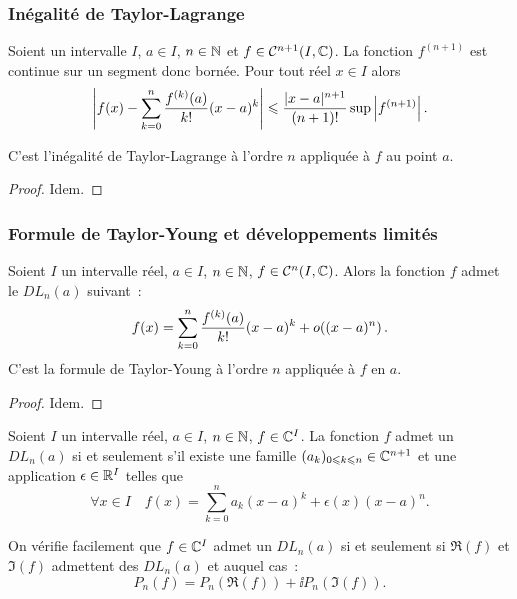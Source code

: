 \subsubsection{Inégalité de Taylor-Lagrange}

\begin{theo}
  Soient un intervalle \(I\), \(a \in I\), \(n \in \mathbb{N}\) et \(f \in
  \mathcal{C}^{{n+1}} (I,\mathbb{C})\). La fonction \(f^{(n+1)}\) est continue sur un segment
  donc bornée. Pour tout réel \(x \in I\) alors
  \begin{equation}
    \left|f(x)-\sum_{k = 0}^n \frac{f^{(k)}(a)}{k!}(x-a)^k\right| \leqslant
    \frac{|x-a|^{n+1}}{(n+1)!} \sup \left\lvert f^{(n+1)}\right\rvert.
  \end{equation}

  C'est l'inégalité de Taylor-Lagrange à l'ordre \(n\) appliquée à \(f\) au
  point \(a\).
\end{theo}
\begin{proof}
  Idem.
\end{proof}

\subsubsection{Formule de Taylor-Young et développements limités}

\begin{theo}
  Soient \(I\) un intervalle réel, \(a \in I\), \(n \in \mathbb{N}\), \(f \in
  \mathcal{C}^{n}(I,\mathbb{C})\). Alors la fonction \(f\) admet le \(DL_n(a)\) suivant~:
  \begin{equation}
    f(x) = \sum_{k = 0}^n \frac{f^{(k)}(a)}{k!} (x-a)^k + o\mathopen{}\left((x-a)^n\right).
  \end{equation}
  C'est la formule de Taylor-Young à l'ordre \(n\) appliquée à \(f\) en \(a\).
\end{theo}
\begin{proof}
  Idem.
\end{proof}

\begin{defdef}
  Soient \(I\) un intervalle réel, \(a \in I\), \(n \in \mathbb{N}\), \(f \in \mathbb{C}^I\). La
  fonction \(f\) admet un \(DL_n(a)\) si et seulement s'il existe une famille
  \((a_k)_{0\leqslant k\leqslant n} \in \mathbb{C}^{n+1}\) et une application \(\epsilon
  \in \mathbb{R}^I\) telles que
  \begin{equation}
    \forall x \in I \quad f(x) = \sum_{k = 0}^n a_k (x-a)^k + \epsilon(x)(x-a)^n.
  \end{equation}

  On vérifie facilement que \(f\in \mathbb{C}^I\) admet un \(DL_n(a)\) si et seulement
  si \(\Re(f)\) et \(\Im(f)\) admettent des \(DL_n(a)\) et auquel cas~:
  \begin{equation}
    P_n(f) = P_n(\Re(f)) + \ii P_n(\Im(f)).
  \end{equation}
\end{defdef}
